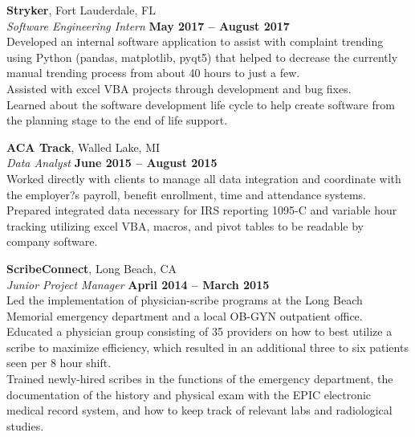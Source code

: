 \documentclass[margin,line]{resume}
\begin{document}
\begin{resume}
    \textbf{\listing Stryker}, Fort Lauderdale, FL \vspace{2mm}\\\vspace{2mm}%
    \textsl{Software Engineering Intern} \hfill \textbf{May 2017 -- August 2017}\\
    Developed an internal software application to assist with complaint trending using Python (pandas, matplotlib, pyqt5) that helped to decrease the currently manual trending process from about 40 hours to just a few.\\
    Assisted with excel VBA projects through development and bug fixes.\\
    Learned about the software development life cycle to help create software from the planning stage to the end of life support.

    \textbf{\listing ACA Track}, Walled Lake, MI \vspace{2mm}\\\vspace{2mm}%
    \textsl{Data Analyst} \hfill \textbf{June 2015 -- August 2015}\\
    Worked directly with clients to manage all data integration and coordinate with the employer?s payroll, benefit enrollment, time and attendance systems.\\
    Prepared integrated data necessary for IRS reporting 1095-C and variable hour tracking utilizing excel VBA, macros, and pivot tables to be readable by company software.


    \textbf{\listing ScribeConnect}, Long Beach, CA \vspace{2mm}\\\vspace{2mm}%
    \textsl{Junior Project Manager} \hfill \textbf{April 2014 -- March 2015}\\
    Led the implementation of physician-scribe programs at the Long Beach Memorial emergency department and a local OB-GYN outpatient office.\\
    Educated a physician group consisting of 35 providers on how to best utilize a scribe to maximize efficiency, which resulted in an additional three to six patients seen per 8 hour shift.\\
    Trained newly-hired scribes in the functions of the emergency department, the documentation of the history and physical exam with the EPIC electronic medical record system, and how to keep track of relevant labs and radiological studies.


\end{resume}
\end{document}
